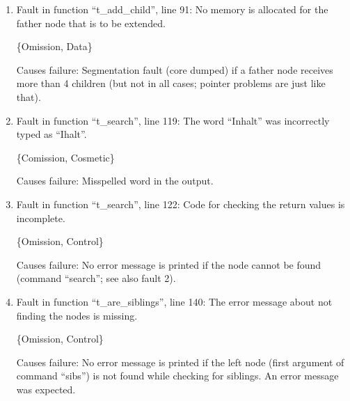 \begin{enumerate}
\item Fault in function ``t\_add\_child'', line 91:
No memory is allocated for the father node that is to be extended.

\{Omission, Data\}

Causes failure:  Segmentation fault (core dumped)
if a father node receives more than 4 children (but not in all cases;
pointer problems are just like that).

% 
% 
% 

\item Fault in function ``t\_search'', line 119:
The word ``Inhalt'' was incorrectly typed as ``Ihalt''.

\{Comission, Cosmetic\}

Causes failure: Misspelled word in the output.

\item Fault in function ``t\_search'', line 122:
Code for checking the return values is incomplete.

\{Omission, Control\}

Causes failure: No error message is printed if the node cannot be
found (command ``search''; see also fault 2).

% 
% 

\item Fault in function ``t\_are\_siblings'', line 140:
The error message about not finding the nodes is missing.

\{Omission, Control\}

Causes failure: No error message is printed if the left node (first
argument of command ``sibs'') is not found while checking for
siblings.  An error message was expected.

% 
% 


\end{enumerate}
